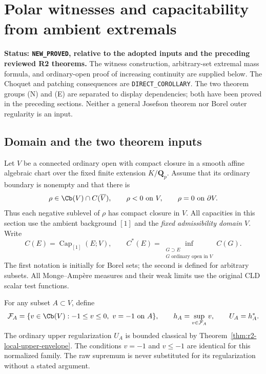 \section{Polar witnesses and capacitability from ambient extremals}
\label{sec:r2-polar-converse-choquet}

\noindent\textbf{Status: \texttt{NEW\_PROVED}, relative to the adopted
inputs and the preceding reviewed R2 theorems.}
The witness construction, arbitrary-set extremal mass formula, and
ordinary-open proof of increasing continuity are supplied below.
The Choquet and patching consequences are
\texttt{DIRECT\_COROLLARY}. The two theorem groups
\textup{(N)} and \textup{(E)} are separated to display dependencies;
both have been proved in the preceding sections. Neither a general
Josefson theorem nor Borel outer regularity is an input.

\subsection{Domain and the two theorem inputs}

Let $V$ be a connected ordinary open with compact closure in a smooth
affine algebraic chart over the fixed finite extension $K/\mathbf Q_p$.
Assume that its ordinary boundary is nonempty and that there is
\[
 \rho\in\Cb(V)\cap C(\overline V),\qquad
 \rho<0\text{ on }V,\qquad \rho=0\text{ on }\partial V.
\]
Thus each negative sublevel of $\rho$ has compact closure in $V$.
All capacities in this section use the ambient background $[1]$ and
the \emph{fixed admissibility domain $V$}. Write
\[
 C(E)=\operatorname{Cap}_{[1]}(E;V),\qquad
 C^*(E)=\inf_{\substack{G\supset E\\G\text{ ordinary open in }V}}C(G).
\]
The first notation is initially for Borel sets; the second is defined
for arbitrary subsets. All Monge--Amp\`ere measures and their weak
limits use the original CLD scalar test functions.

For any subset $A\subset V$, define
\[
 \mathcal F_A=\{v\in\Cb(V):-1\leq v\leq0,\ v=-1\text{ on }A\},
 \qquad h_A=\sup_{v\in\mathcal F_A}v,\qquad U_A=h_A^*.
\]
The ordinary upper regularization $U_A$ is bounded classical by
Theorem~\ref{thm:r2-local-upper-envelope}. The conditions $v=-1$
and $v\leq-1$ are identical for this normalized family. The raw
supremum is never substituted for its regularization without a
stated argument.

